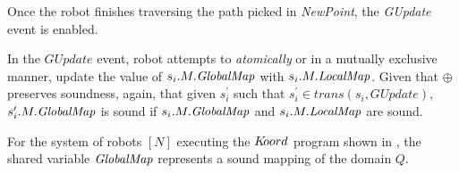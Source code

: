 Once the robot finishes traversing the path picked in \emph{NewPoint}, the \emph{GUpdate} event is enabled.


In the $GUpdate$ event, robot attempts to \emph{atomically} or in a mutually exclusive manner, update the value of $s_i.M.\mathit{GlobalMap}$ with  $s_i.M.\mathit{LocalMap}$. Given that $\oplus$ preserves soundness, again, that given $s_i^\prime$ such that $\mathit{s_i^\prime \in \mathit{trans}(s_i,\mathit{GUpdate})}$,  $s_i^\prime.M.\mathit{GlobalMap}$ is sound if $s_i.M.\mathit{GlobalMap}$ and $s_i.M.\mathit{LocalMap}$ are sound.

\begin{theorem}
    For the system of robots $[N]$ executing the $K\kern-2pt oord$ program shown in , the shared variable $\mathit{GlobalMap}$ represents a sound mapping of the domain $Q$.
\end{theorem}


